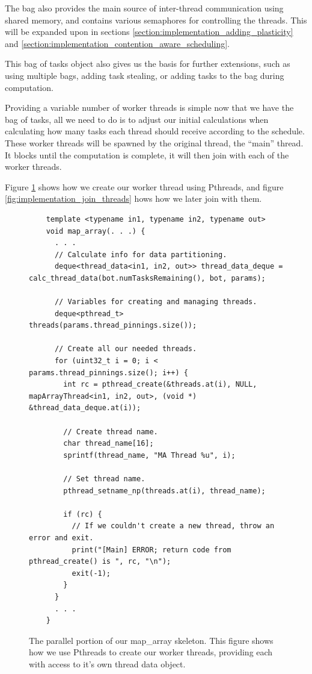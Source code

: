 The bag also provides the main source of inter-thread communication using shared memory, and contains various semaphores for controlling the threads. This will be expanded upon in sections \ref{section:implementation_adding_plasticity} and \ref{section:implementation_contention_aware_scheduling}.

This bag of tasks object also gives us the basis for further extensions, such as using multiple bags, adding task stealing, or adding tasks to the bag during computation.

Providing a variable number of worker threads is simple now that we have the bag of tasks, all we need to do is to adjust our initial calculations when calculating how many tasks each thread should receive according to the schedule. These worker threads will be spawned by the original thread, the ``main'' thread. It blocks until the computation is complete, it will then join with each of the worker threads.

Figure \ref{fig:implementation_create_threads} shows how we create our worker thread using Pthreads, and figure \ref{fig:implementation_join_threads} hows how we later join with them.



\begin{figure}
	\begin{lstlisting}
	template <typename in1, typename in2, typename out>
	void map_array(. . .) {
	  . . .
	  // Calculate info for data partitioning.
	  deque<thread_data<in1, in2, out>> thread_data_deque = calc_thread_data(bot.numTasksRemaining(), bot, params);
  
	  // Variables for creating and managing threads.
	  deque<pthread_t> threads(params.thread_pinnings.size());
  
	  // Create all our needed threads.
	  for (uint32_t i = 0; i < params.thread_pinnings.size(); i++) {
	    int rc = pthread_create(&threads.at(i), NULL, mapArrayThread<in1, in2, out>, (void *) &thread_data_deque.at(i));
  
	    // Create thread name.
	    char thread_name[16];
	    sprintf(thread_name, "MA Thread %u", i);
  
	    // Set thread name.
	    pthread_setname_np(threads.at(i), thread_name);
  
	    if (rc) {
	      // If we couldn't create a new thread, throw an error and exit.
	      print("[Main] ERROR; return code from pthread_create() is ", rc, "\n");
	      exit(-1);
	    }
	  }
	  . . .
	}
	\end{lstlisting}

	\caption{The parallel portion of our map\_array skeleton. This figure shows how we use Pthreads to create our worker threads, providing each with access to it's own thread data object.}
	\label{fig:implementation_create_threads}
\end{figure}



